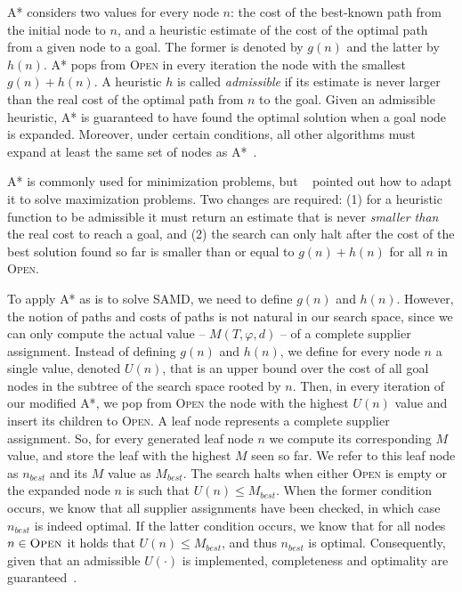 \documentclass[letterpaper]{article} %
\newcommand{\samd}{\ac{SAMD}\xspace}
\newcommand{\astar}{\textsc{A*}\xspace}
\newcommand{\open}{\textsc{Open}\xspace}
\begin{document}
\astar considers two values for every node $n$: 
the cost of the best-known path from the initial node to $n$, 
and a heuristic estimate of the cost of the optimal path from a given node to a goal. 
The former is denoted by $g(n)$ and the latter by $h(n)$. \astar pops from \open in every iteration the 
node with the smallest $g(n)+h(n)$. 
A heuristic $h$ is called \emph{admissible} if its estimate is never larger than the real cost of the optimal path from $n$ to the goal. 
Given an admissible heuristic, \astar is guaranteed to have found the optimal solution when a goal node is expanded. Moreover, under certain conditions, all other algorithms must expand at least the same set of nodes as \astar~\cite{dechter1985generalized,holte2019OnThe}. 


\astar is commonly used for minimization problems, but ~\cite{stern2014max} pointed out how to adapt it to solve maximization problems. Two changes are required: (1) for a heuristic function to be admissible it must return an estimate that is never \emph{smaller than} the real cost to reach a goal, 
and (2) the search can only halt after the cost of the best solution found so far 
is smaller than or equal to $g(n)+h(n)$ for all $n$ in \open. 

To apply \astar as is to solve \samd, we need to define $g(n)$ and $h(n)$. However, 
the notion of paths and costs of paths is not natural in our search space, 
since we can only compute the actual value -- $M(T, \varphi,d)$ -- of a complete supplier assignment. 
Instead of defining $g(n)$ and $h(n)$, we define for every node $n$ a single value, denoted $U(n)$, 
that is an upper bound over the cost of all goal nodes in the subtree of the search space rooted by $n$. 
Then, in every iteration of our modified \astar, we pop from \open the node with the highest $U(n)$ value
and insert its children to \open. 
A leaf node represents a complete supplier assignment. So, for every generated leaf node $n$ we compute its corresponding $M$ value, and store the leaf with the highest $M$ seen so far. We refer to this leaf node as $n_{best}$ and its $M$ value as $M_{best}$.  The search halts when either \open is empty or the expanded node $n$ is such that $U(n)\leq M_{best}$. When the former condition occurs, we know that all supplier assignments have been checked, in which case $n_{best}$ is indeed optimal. If the latter condition occurs, we know that for all nodes $n\in \open$ it holds that $U(n)\leq M_{best}$, and thus $n_{best}$ is optimal. Consequently, given that an admissible $U(\cdot)$ is implemented, completeness and optimality are guaranteed~\cite{stern2014max,holte2019OnThe}. 
\end{document}
